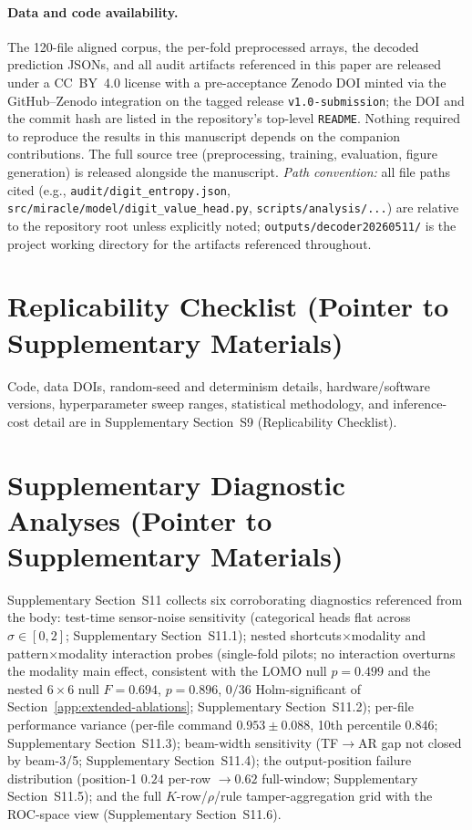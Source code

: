 \documentclass[sensors,article,submit,moreauthors,pdftex]{Definitions/mdpi}
\begin{document}
\paragraph{Data and code availability.} The 120-file aligned corpus, the per-fold preprocessed arrays, the decoded prediction JSONs, and all audit artifacts referenced in this paper are released under a CC~BY~4.0 license with a pre-acceptance Zenodo DOI minted via the GitHub--Zenodo integration on the tagged release \texttt{v1.0-submission}; the DOI and the commit hash are listed in the repository's top-level \texttt{README}. Nothing required to reproduce the results in this manuscript depends on the companion contributions. The full source tree (preprocessing, training, evaluation, figure generation) is released alongside the manuscript. \emph{Path convention:} all file paths cited (e.g., \texttt{audit/digit\_entropy.json}, \texttt{src/miracle/model/digit\_value\_head.py}, \texttt{scripts/analysis/...}) are relative to the repository root unless explicitly noted; \texttt{outputs/decoder20260511/} is the project working directory for the artifacts referenced throughout.

\section{Replicability Checklist (Pointer to Supplementary Materials)}
\label{app:replicability}

Code, data DOIs, random-seed and determinism details, hardware/software versions, hyperparameter sweep ranges, statistical methodology, and inference-cost detail are in Supplementary Section~S9 (Replicability Checklist).

\section{Supplementary Diagnostic Analyses (Pointer to Supplementary Materials)}
\label{app:diagnostics}

Supplementary Section~S11 collects six corroborating diagnostics referenced from the body: test-time sensor-noise sensitivity (categorical heads flat across $\sigma\!\in\![0,2]$; Supplementary Section~S11.1); nested shortcuts$\times$modality and pattern$\times$modality interaction probes (single-fold pilots; no interaction overturns the modality main effect, consistent with the LOMO null $p\!=\!0.499$ and the nested $6\!\times\!6$ null $F\!=\!0.694$, $p\!=\!0.896$, $0/36$ Holm-significant of Section~\ref{app:extended-ablations}; Supplementary Section~S11.2); per-file performance variance (per-file command $0.953 \pm 0.088$, 10th percentile $0.846$; Supplementary Section~S11.3); beam-width sensitivity (TF$\to$AR gap not closed by beam-3/5; Supplementary Section~S11.4); the output-position failure distribution (position-1 $0.24$ per-row $\to 0.62$ full-window; Supplementary Section~S11.5); and the full $K$-row/$\rho$/rule tamper-aggregation grid with the ROC-space view (Supplementary Section~S11.6).
\end{document}
